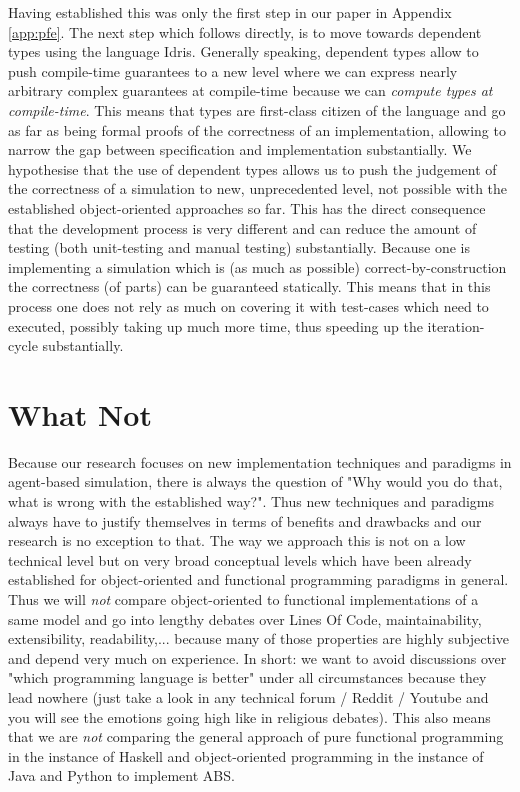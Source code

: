 Having established this was only the first step in our paper in Appendix \ref{app:pfe}. The next step which follows directly, is to move towards dependent types using the language Idris. Generally speaking, dependent types allow to push compile-time guarantees to a new level where we can express nearly arbitrary complex guarantees at compile-time because we can \textit{compute types at compile-time}. This means that types are first-class citizen of the language and go as far as being formal proofs of the correctness of an implementation, allowing to narrow the gap between specification and implementation substantially. We hypothesise that the use of dependent types allows us to push the judgement of the correctness of a simulation to new, unprecedented level, not possible with the established object-oriented approaches so far. This has the direct consequence that the development process is very different and can reduce the amount of testing (both unit-testing and manual testing) substantially. Because one is implementing a simulation which is (as much as possible) correct-by-construction the correctness (of parts) can be guaranteed statically. This means that in this process one does not rely as much on covering it with test-cases which need to executed, possibly taking up much more time, thus speeding up the iteration-cycle substantially.

\section{What Not}
Because our research focuses on new implementation techniques and paradigms in agent-based simulation, there is always the question of "Why would you do that, what is wrong with the established way?". Thus new techniques and paradigms always have to justify themselves in terms of benefits and drawbacks and our research is no exception to that. The way we approach this is not on a low technical level but on very broad conceptual levels which have been already established for object-oriented and functional programming paradigms in general. Thus we will \textit{not} compare object-oriented to functional implementations of a same model and go into lengthy debates over Lines Of Code, maintainability, extensibility, readability,... because many of those properties are highly subjective and depend very much on experience. In short: we want to avoid discussions over "which programming language is better" under all circumstances because they lead nowhere (just take a look in any technical forum / Reddit / Youtube and you will see the emotions going high like in religious debates). This also means that we are \textit{not} comparing the general approach of pure functional programming in the instance of Haskell and object-oriented programming in the instance of Java and Python to implement ABS.

